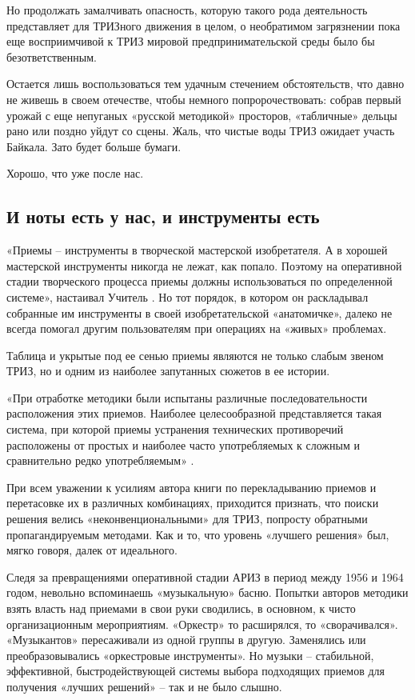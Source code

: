 \documentclass[11pt,a4paper]{article}
\begin{document}
Но продолжать замалчивать опасность, которую такого рода деятельность
представляет для ТРИЗного движения в целом, о необратимом загрязнении пока еще
восприимчивой к ТРИЗ мировой предпринимательской среды было бы
безответственным.

Остается лишь воспользоваться тем удачным стечением обстоятельств, что давно
не живешь в своем отечестве, чтобы немного попророчествовать: собрав первый
урожай с еще непуганых «русской методикой» просторов, «табличные» дельцы рано
или поздно уйдут со сцены. Жаль, что чистые воды ТРИЗ ожидает участь Байкала.
Зато будет больше бумаги.

Хорошо, что уже после нас.

\subsection*{И ноты есть у нас, и инструменты есть}

«Приемы -- инструменты в творческой мастерской изобретателя. А в хорошей
мастерской инструменты никогда не лежат, как попало. Поэтому на оперативной
стадии творческого процесса приемы должны использоваться по определенной
системе», настаивал Учитель \cite{Altshuller1961}. Но тот порядок, в котором
он раскладывал собранные им инструменты в своей изобретательской «анатомичке»,
далеко не всегда помогал другим пользователям при операциях на «живых»
проблемах.

Таблица и укрытые под ее сенью приемы являются не только слабым звеном ТРИЗ,
но и одним из наиболее запутанных сюжетов в ее истории.

«При отработке методики были испытаны различные последовательности
расположения этих приемов. Наиболее целесообразной представляется такая
система, при которой приемы устранения технических противоречий расположены от
простых и наиболее часто употребляемых к сложным и сравнительно редко
употребляемым» \cite{Altshuller1961}.

При всем уважении к усилиям автора книги по перекладыванию приемов и
перетасовке их в различных комбинациях, приходится признать, что поиски
решения велись «неконвенциональными» для ТРИЗ, попросту обратными
пропагандируемым методами. Как и то, что уровень «лучшего решения» был, мягко
говоря, далек от идеального.

Следя за превращениями оперативной стадии АРИЗ в период между 1956 и 1964
годом, невольно вспоминаешь «музыкальную» басню. Попытки авторов методики
взять власть над приемами в свои руки сводились, в основном, к чисто
организационным мероприятиям. «Оркестр» то расширялся, то «сворачивался».
«Музыкантов» пересаживали из одной группы в другую. Заменялись или
преобразовывались «оркестровые инструменты». Но музыки -- стабильной,
эффективной, быстродействующей системы выбора подходящих приемов для получения
«лучших решений» -- так и не было слышно.
\end{document}
